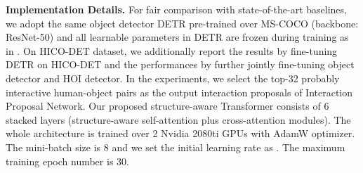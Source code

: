 \documentclass[10pt,twocolumn,letterpaper]{article}
\begin{document}
\textbf{Implementation Details.}
For fair comparison with state-of-the-art baselines, we adopt the same object detector DETR pre-trained over MS-COCO (backbone: ResNet-50) and all learnable parameters in DETR are frozen during training as in \cite{kim2021hotr}. On HICO-DET dataset, we additionally report the results by fine-tuning DETR on HICO-DET and the performances by further jointly fine-tuning object detector and HOI detector. In the experiments, we select the top-32 probably interactive human-object pairs as the output interaction proposals of Interaction Proposal Network. Our proposed structure-aware Transformer consists of 6 stacked layers (structure-aware self-attention plus cross-attention modules). The whole architecture is trained over 2 Nvidia 2080ti GPUs with AdamW optimizer. The mini-batch size is 8 and we set the initial learning rate as . The maximum training epoch number is 30.
\end{document}
